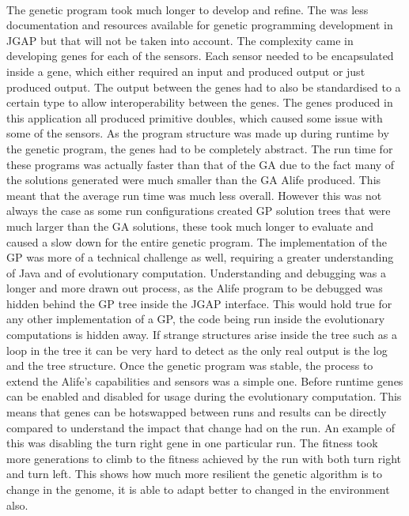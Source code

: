\documentclass[12pt]{article}
\begin{document}
\paragraph{}
The genetic program took much longer to develop and refine. The was less documentation and resources available for genetic programming 
development in JGAP but that will not be taken into account. The complexity came in developing genes for each of the sensors. Each sensor
needed to be encapsulated inside a gene, which either required an input and produced output or just produced output. The output between
the genes had to also be standardised to a certain type to allow interoperability between the genes. The genes produced in this application
all produced primitive doubles, which caused some issue with some of the sensors. As the program structure was made up during runtime by
the genetic program, the genes had to be completely abstract. The run time for these programs was actually faster than that of the GA due
to the fact many of the solutions generated were much smaller than the GA Alife produced. This meant that the average run time was much 
less overall. However this was not always the case as some run configurations created GP solution trees that were much larger than the 
GA solutions, these took much longer to evaluate and caused a slow down for the entire genetic program. The implementation of the GP was 
more of a technical challenge as well, requiring a greater understanding of Java and of evolutionary computation. Understanding and debugging
was a longer and more drawn out process, as the Alife program to be debugged was hidden behind the GP tree inside the JGAP interface.
This would hold true for any other implementation of a GP, the code being run inside the evolutionary computations is hidden away. If strange
structures arise inside the tree such as a loop in the tree it can be very hard to detect as the only real output is the log and
the tree structure. Once the genetic program was stable, the process to extend the Alife's capabilities and sensors was a simple one. Before
runtime genes can be enabled and disabled for usage during the evolutionary computation. This means that genes can be hotswapped between
runs and results can be directly compared to understand the impact that change had on the run. An example of this was disabling the turn
right gene in one particular run. The fitness took more generations to climb to the fitness achieved by the run with both turn right and
turn left. This shows how much more resilient the genetic algorithm is to change in the genome, it is able to adapt better to changed in
the environment also.
\end{document}
